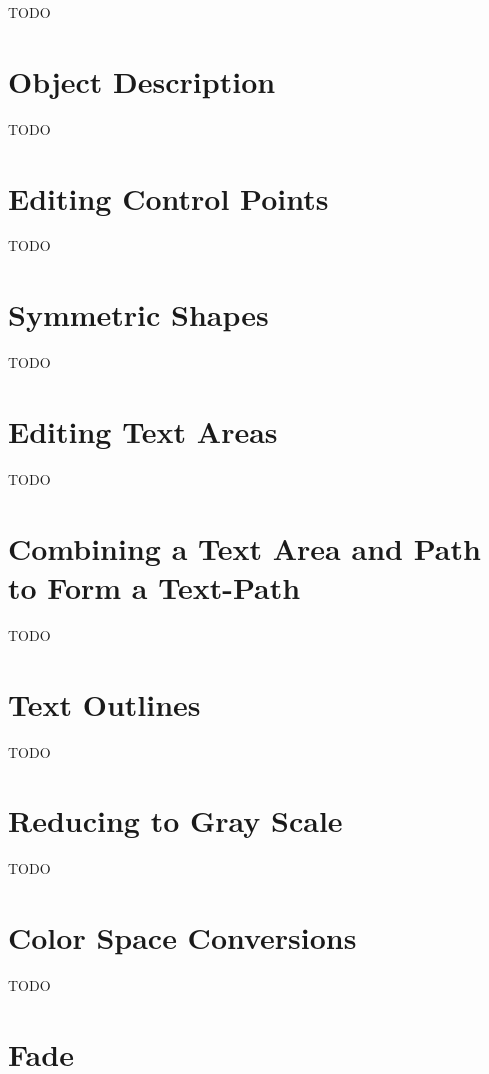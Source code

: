 TODO


\section{Object Description}\label{sec:objectdescription}

TODO


\section{Editing Control Points}\label{sec:editpath}

TODO


\section{Symmetric Shapes}\label{sec:symmetric}

TODO


\section{Editing Text Areas}\label{sec:edittext}

TODO


\section{Combining a Text Area and Path to Form a Text-Path}\label{sec:textpath}

TODO


\section{Text Outlines}\label{sec:textoutline}

TODO


\section{Reducing to Gray Scale}\label{sec:reduce}

TODO


\section{Color Space Conversions}\label{sec:convertcolspace}

TODO


\section{Fade}\label{sec:fade}

